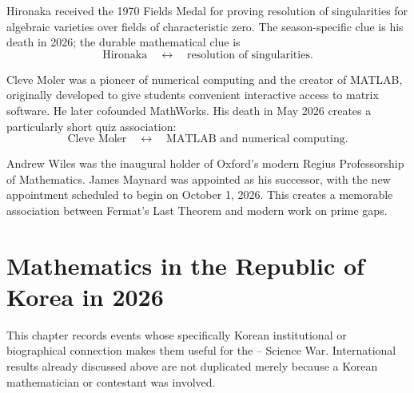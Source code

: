     \begin{fact}
        Hironaka received the 1970 Fields Medal for proving resolution of
        singularities for algebraic varieties over fields of characteristic
        zero. The season-specific clue is his death in 2026; the durable
        mathematical clue is
        \[
            \text{Hironaka}
            \quad\longleftrightarrow\quad
            \text{resolution of singularities}.
        \]
    \end{fact}

    \begin{fact}
        Cleve Moler was a pioneer of numerical computing and the creator of
        MATLAB, originally developed to give students convenient interactive
        access to matrix software. He later cofounded MathWorks. His death in
        May 2026 creates a particularly short quiz association:
        \[
            \text{Cleve Moler}
            \quad\longleftrightarrow\quad
            \text{MATLAB and numerical computing}.
        \]
    \end{fact}

    \begin{fact}
        Andrew Wiles was the inaugural holder of Oxford's modern Regius
        Professorship of Mathematics. James Maynard was appointed as his
        successor, with the new appointment scheduled to begin on October 1,
        2026. This creates a memorable association between Fermat's Last Theorem
        and modern work on prime gaps.
    \end{fact}

    \chapter{Mathematics in the Republic of Korea in 2026}

    This chapter records events whose specifically Korean institutional or
    biographical connection makes them useful for the \POSTECH--\KAIST{} Science
    War. International results already discussed above are not duplicated merely
    because a Korean mathematician or contestant was involved.

    \vspace{1em}

